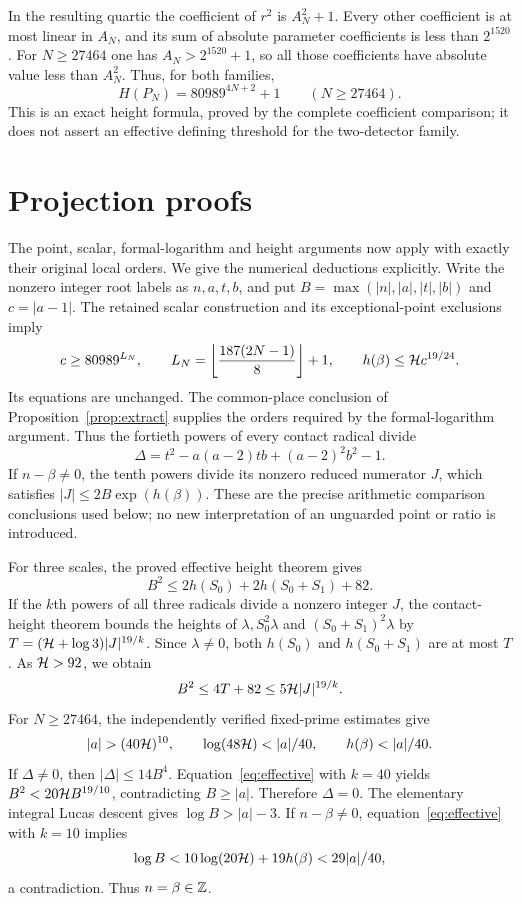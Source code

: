 \documentclass[11pt,a4paper]{article}
\theoremstyle{remark}\newtheorem{remark}[theorem]{Remark}
\begin{document}
In the resulting quartic the coefficient of $r^2$ is $A_N^2+1$.
Every other coefficient is at most linear in $A_N$, and its sum of
absolute parameter coefficients is less than $2^{1520}$. For
$N\ge27464$ one has $A_N>2^{1520}+1$, so all those coefficients have
absolute value less than $A_N^2$. Thus, for both families,
\[
                        H(P_N)=80989^{4N+2}+1
                        \qquad(N\ge27464).
\]
This is an exact height formula, proved by the complete coefficient
comparison; it does not assert an effective defining threshold for the
two-detector family.

\section{Projection proofs}
The point, scalar, formal-logarithm and height arguments now apply with
exactly their original local orders. We give the numerical deductions
explicitly. Write the nonzero integer root labels as $n,a,t,b$, and put
$B=\max(|n|,|a|,|t|,|b|)$ and $c=|a-1|$. The retained scalar construction
and its exceptional-point exclusions imply
\[
 c\ge80989^{L_N},\qquad L_N=\left\lfloor\frac{187(2N-1)}8\right\rfloor+1,
 \qquad h(\beta)\le\mathcal H c^{19/24}.
\]
Its equations are unchanged. The common-place conclusion of
Proposition~\ref{prop:extract} supplies the orders required by the
formal-logarithm argument. Thus the fortieth powers of every contact
radical divide
\[
 \Delta=t^2-a(a-2)tb+(a-2)^2b^2-1.
\]
If $n-\beta\ne0$, the tenth powers divide its nonzero reduced numerator
$J$, which satisfies $|J|\le2B\exp(h(\beta))$. These are the precise
arithmetic comparison conclusions used below; no new interpretation of
an unguarded point or ratio is introduced.

For three scales, the proved effective height theorem gives
\[
 B^2\le2h(S_0)+2h(S_0+S_1)+82.
\]
If the $k$th powers of all three radicals divide a nonzero integer $J$,
the contact-height theorem bounds the heights of $\lambda,S_0^2\lambda$
and $(S_0+S_1)^2\lambda$ by
$T=(\mathcal H+\log3)|J|^{19/k}$. Since $\lambda\ne0$, both $h(S_0)$ and
$h(S_0+S_1)$ are at most $T$. As $\mathcal H>92$, we obtain
\begin{equation}\label{eq:effective}
 B^2\le4T+82\le5\mathcal H|J|^{19/k}.
\end{equation}
For $N\ge27464$, the independently verified fixed-prime estimates give
\[
 |a|>(40\HH)^{10},\qquad \log(48\HH)<|a|/40,
 \qquad h(\beta)<|a|/40.
\]
If $\Delta\ne0$, then $|\Delta|\le14B^4$. Equation~\eqref{eq:effective}
with $k=40$ yields
$B^2<20\mathcal H B^{19/10}$, contradicting $B\ge|a|$. Therefore $\Delta=0$.
The elementary integral Lucas descent gives $\log B>|a|-3$.
If $n-\beta\ne0$, equation~\eqref{eq:effective} with $k=10$ implies
\[
 \log B<10\log(20\mathcal H)+19h(\beta)<29|a|/40,
\]
a contradiction. Thus $n=\beta\in\mathbb Z$.
\end{document}
